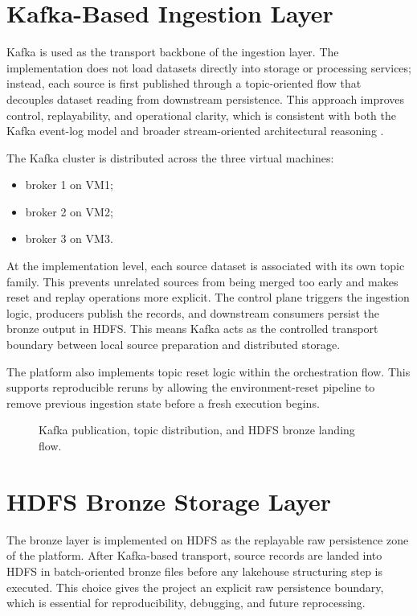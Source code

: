 \section{Kafka-Based Ingestion Layer}
Kafka is used as the transport backbone of the ingestion layer. The implementation does not load datasets directly into storage or processing services; instead, each source is first published through a topic-oriented flow that decouples dataset reading from downstream persistence. This approach improves control, replayability, and operational clarity, which is consistent with both the Kafka event-log model and broader stream-oriented architectural reasoning \cite{apache_kafka_docs,kreps2014questioning}.

The Kafka cluster is distributed across the three virtual machines:
\begin{itemize}
    \item broker 1 on VM1;
    \item broker 2 on VM2;
    \item broker 3 on VM3.
\end{itemize}

At the implementation level, each source dataset is associated with its own topic family. This prevents unrelated sources from being merged too early and makes reset and replay operations more explicit. The control plane triggers the ingestion logic, producers publish the records, and downstream consumers persist the bronze output in HDFS. This means Kafka acts as the controlled transport boundary between local source preparation and distributed storage.

The platform also implements topic reset logic within the orchestration flow. This supports reproducible reruns by allowing the environment-reset pipeline to remove previous ingestion state before a fresh execution begins.

\begin{figure}[H]
    \centering
    
    \caption{Kafka publication, topic distribution, and HDFS bronze landing flow.}
    \label{fig:chapter5-kafka-ingestion}
\end{figure}

\section{HDFS Bronze Storage Layer}
The bronze layer is implemented on HDFS as the replayable raw persistence zone of the platform. After Kafka-based transport, source records are landed into HDFS in batch-oriented bronze files before any lakehouse structuring step is executed. This choice gives the project an explicit raw persistence boundary, which is essential for reproducibility, debugging, and future reprocessing.

